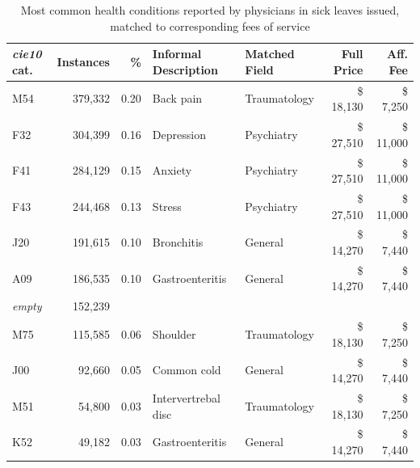 \documentclass[../main.tex]{subfiles}
\begin{document}
\begin{table}[H]
    \centering
\footnotesize
    \begin{tabular}{lrrllrr}
    \toprule
    \textit{cie10} cat. & Instances & \% & Informal Description & Matched Field & Full Price & Aff. Fee  \\
    \midrule
    M54            & 379,332    & 0.20       & Back pain            & Traumatology  & \$ 18,130 & \$ 7,250    \\
    F32            & 304,399    & 0.16       & Depression           & Psychiatry    & \$ 27,510 & \$ 11,000  \\
    F41            & 284,129    & 0.15       & Anxiety              & Psychiatry    & \$ 27,510 & \$ 11,000   \\
    F43            & 244,468    & 0.13       & Stress               & Psychiatry    & \$ 27,510 & \$ 11,000   \\
    J20            & 191,615    & 0.10       & Bronchitis           & General       & \$ 14,270 & \$ 7,440    \\
    A09            & 186,535    & 0.10       & Gastroenteritis      & General       & \$ 14,270 & \$ 7,440    \\
    \textit{empty}  & 152,239   &            &                      &               &       &         \\
    M75            & 115,585    & 0.06       & Shoulder             & Traumatology  & \$ 18,130 & \$ 7,250   \\
    J00            & 92,660     & 0.05       & Common cold          & General       & \$ 14,270 & \$ 7,440    \\
    M51            & 54,800     & 0.03       & Intervertrebal disc  & Traumatology  & \$ 18,130 & \$ 7,250    \\
    K52            & 49,182     & 0.03       & Gastroenteritis      & General       & \$ 14,270 & \$ 7,440    \\
    \bottomrule
    \end{tabular}
    \caption{Most common health conditions reported by physicians in sick leaves issued, matched to corresponding fees of service}
    \label{tab:cond}
\end{table}
\end{document}
